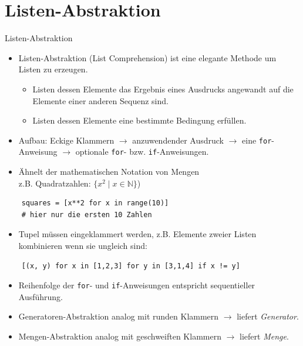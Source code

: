 \documentclass[utf8, smaller, c]{beamer}
\renewcommand{\tt}[1]{{\texttt{#1}}}
\begin{document}
\section{Listen-Abstraktion}
\begin{frame}{Listen-Abstraktion}
	\begin{itemize}
		\item Listen-Abstraktion (List Comprehension) ist eine elegante Methode um Listen zu erzeugen.
		\begin{itemize}
			\item Listen dessen Elemente das Ergebnis eines Ausdrucks angewandt auf die Elemente einer anderen Sequenz sind.
			\item Listen dessen Elemente eine bestimmte Bedingung erfüllen.
		\end{itemize}
		\item Aufbau: Eckige Klammern $\rightarrow$ anzuwendender Ausdruck $\rightarrow$ eine \tt{for}-Anweisung $\rightarrow$ optionale \tt{for}- bzw. \tt{if}-Anweisungen.
		\item Ähnelt der mathematischen Notation von Mengen\\ z.B. Quadratzahlen: $\{x^2\mid x\in\mathbb{N}\}$)
	\end{itemize}
	\begin{lstlisting}
	squares = [x**2 for x in range(10)]
	# hier nur die ersten 10 Zahlen
	\end{lstlisting}
	
	\pagebreak
	
	\vspace*{-2mm}
	\begin{itemize}
		\item Tupel müssen eingeklammert werden, z.B. Elemente zweier Listen kombinieren wenn sie ungleich sind:
	\end{itemize}
	\begin{lstlisting}
	[(x, y) for x in [1,2,3] for y in [3,1,4] if x != y]
	\end{lstlisting}
	\begin{itemize}
		\item Reihenfolge der \tt{for}- und \tt{if}-Anweisungen entspricht sequentieller Ausführung.
		\item Generatoren-Abstraktion analog mit runden Klammern $\rightarrow$ liefert \textit{Generator}.
		\item Mengen-Abstraktion analog mit geschweiften Klammern $\rightarrow$ liefert \textit{Menge}.
	\end{itemize}
\end{frame}
\end{document}
